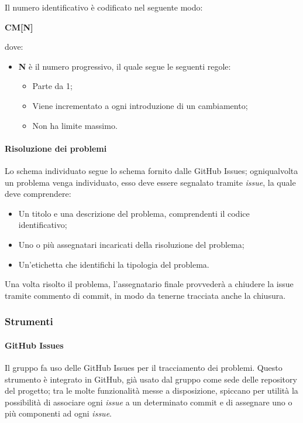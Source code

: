 \documentclass[../norme-di-progetto.tex]{subfiles}
\begin{document}
Il numero identificativo è codificato nel seguente modo: \\
\begin{center}
  \centering
  \textbf{CM[N]}
\end{center} dove:
\begin{itemize}
  \item \textbf{N} è il numero progressivo, il quale segue le seguenti regole:
  \begin{itemize}
    \item Parte da 1;
    \item Viene incrementato a ogni introduzione di un cambiamento;
    \item Non ha limite massimo.
  \end{itemize}
\end{itemize}

\paragraph{Risoluzione dei problemi}
Lo schema individuato segue lo schema fornito dalle GitHub Issues; ogniqualvolta un problema venga individuato, esso deve essere segnalato tramite \textit{issue}, la quale deve comprendere:
\begin{itemize}
  \item Un titolo e una descrizione del problema, comprendenti il codice identificativo;
  \item Uno o più assegnatari incaricati della risoluzione del problema;
  \item Un'etichetta che identifichi la tipologia del problema.
\end{itemize}
Una volta risolto il problema, l'assegnatario finale provvederà a chiudere la issue tramite commento di commit, in modo da tenerne tracciata anche la chiusura.

\subsubsection{Strumenti}
\paragraph{GitHub Issues}
Il gruppo fa uso delle GitHub Issues per il tracciamento dei problemi. Questo strumento è integrato in GitHub, già usato dal gruppo come sede delle repository del progetto; tra le molte funzionalità messe a disposizione, spiccano per utilità la possibilità di associare ogni \textit{issue} a un determinato commit e di assegnare uno o più componenti ad ogni \textit{issue}.
\end{document}
